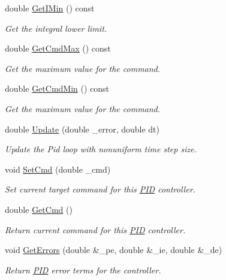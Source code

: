 \begin{DoxyCompactItemize}
double \hyperlink{classnubot_1_1PID_ad0330647e22283f20d217b0e2d6cd420}{Get\-I\-Min} () const 
\begin{DoxyCompactList}\small\item\em Get the integral lower limit. \end{DoxyCompactList}\item 
double \hyperlink{classnubot_1_1PID_a0738df8f919a587a843f23387e7f67f4}{Get\-Cmd\-Max} () const 
\begin{DoxyCompactList}\small\item\em Get the maximum value for the command. \end{DoxyCompactList}\item 
double \hyperlink{classnubot_1_1PID_a64a6e969502546bc315ff69ef157269f}{Get\-Cmd\-Min} () const 
\begin{DoxyCompactList}\small\item\em Get the maximum value for the command. \end{DoxyCompactList}\item 
double \hyperlink{classnubot_1_1PID_aa1e86d60a148f38574c130538e0ea9d1}{Update} (double \-\_\-error, double dt)
\begin{DoxyCompactList}\small\item\em Update the Pid loop with nonuniform time step size. \end{DoxyCompactList}\item 
void \hyperlink{classnubot_1_1PID_ac2a48aa0f59da310078de11a776968d7}{Set\-Cmd} (double \-\_\-cmd)
\begin{DoxyCompactList}\small\item\em Set current target command for this \hyperlink{classnubot_1_1PID}{P\-I\-D} controller. \end{DoxyCompactList}\item 
double \hyperlink{classnubot_1_1PID_afcc5fde219a034baee2be82906c17996}{Get\-Cmd} ()
\begin{DoxyCompactList}\small\item\em Return current command for this \hyperlink{classnubot_1_1PID}{P\-I\-D} controller. \end{DoxyCompactList}\item 
void \hyperlink{classnubot_1_1PID_a23f7bafbad7472d8d8dce24236bf5baa}{Get\-Errors} (double \&\-\_\-pe, double \&\-\_\-ie, double \&\-\_\-de)
\begin{DoxyCompactList}\small\item\em Return \hyperlink{classnubot_1_1PID}{P\-I\-D} error terms for the controller. \end{DoxyCompactList}\item 

\end{DoxyCompactItemize}
